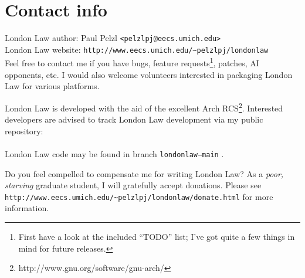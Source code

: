 \documentclass[11pt,notitlepage]{article}
\begin{document}
\section*{Contact info}
London Law author: Paul Pelzl {\tt <pelzlpj@eecs.umich.edu>} \\
London Law website: {\tt http://www.eecs.umich.edu/\~{}pelzlpj/londonlaw} \\


\noindent
Feel free to contact me if you have bugs, feature requests\footnote{First have a look at the
included ``TODO'' list; I've got quite a few things in mind for future releases.}, patches, AI
opponents, etc.  I would also welcome volunteers
interested in packaging London Law for various platforms.

London Law is developed with the aid of the excellent 
Arch RCS\footnote{http://www.gnu.org/software/gnu-arch/}.  
Interested developers are advised to track London Law development via my public repository: \\
 \\
London Law code may be found in branch {\tt londonlaw--main} .

Do you feel compelled to compensate me for writing London Law?  As a {\em poor, 
starving} graduate student, I will gratefully accept donations.  Please see \\
{\tt http://www.eecs.umich.edu/\~{}pelzlpj/londonlaw/donate.html} for more information.
\end{document}
